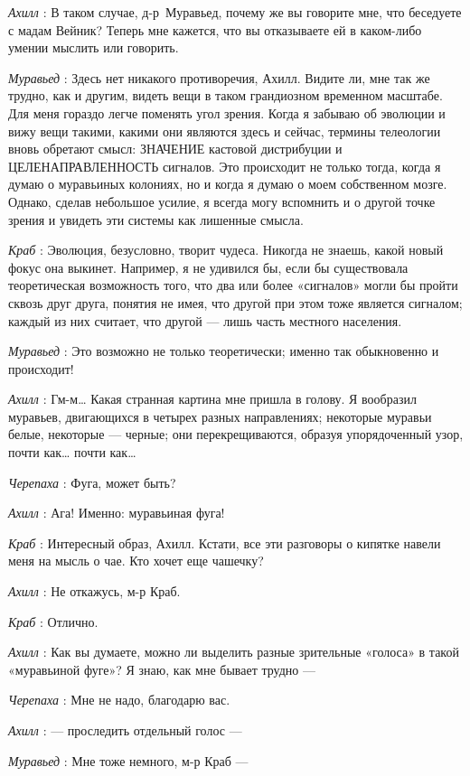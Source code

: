 \documentclass[../main.tex]{subfiles}
\begin{document}
\begin{dialogue}
\emph{Ахилл} : В таком случае, д-р~Муравьед, почему же вы говорите мне, что беседуете с мадам Вейник? Теперь мне кажется, что вы отказываете ей в каком-либо умении мыслить или говорить.

\emph{Муравьед} : Здесь нет никакого противоречия, Ахилл. Видите ли, мне так же трудно, как и другим, видеть вещи в таком грандиозном временном масштабе. Для меня гораздо легче поменять угол зрения. Когда я забываю об эволюции и вижу вещи такими, какими они являются здесь и сейчас, термины телеологии вновь обретают смысл: ЗНАЧЕНИЕ кастовой дистрибуции и ЦЕЛЕНАПРАВЛЕННОСТЬ сигналов. Это происходит не только тогда, когда я думаю о муравьиных колониях, но и когда я думаю о моем собственном мозге. Однако, сделав небольшое усилие, я всегда могу вспомнить и о другой точке зрения и увидеть эти системы как лишенные смысла.

\emph{Краб} : Эволюция, безусловно, творит чудеса. Никогда не знаешь, какой новый фокус она выкинет. Например, я не удивился бы, если бы существовала теоретическая возможность того, что два или более «сигналов» могли бы пройти сквозь друг друга, понятия не имея, что другой при этом тоже является сигналом; каждый из них считает, что другой --- лишь часть местного населения.

\emph{Муравьед} : Это возможно не только теоретически; именно так обыкновенно и происходит!

\emph{Ахилл} : Гм-м\ldots{} Какая странная картина мне пришла в голову. Я вообразил муравьев, двигающихся в четырех разных направлениях; некоторые муравьи белые, некоторые --- черные; они перекрещиваются, образуя упорядоченный узор, почти как\ldots{} почти как\ldots{}

\emph{Черепаха} : Фуга, может быть?

\emph{Ахилл} : Ага! Именно: муравьиная фуга!

\emph{Краб} : Интересный образ, Ахилл. Кстати, все эти разговоры о кипятке навели меня на мысль о чае. Кто хочет еще чашечку?

\emph{Ахилл} : Не откажусь, м-р Краб.

\emph{Краб} : Отлично.

\emph{Ахилл} : Как вы думаете, можно ли выделить разные зрительные «голоса» в такой «муравьиной фуге»? Я знаю, как мне бывает трудно ---

\emph{Черепаха} : Мне не надо, благодарю вас.

\emph{Ахилл} : --- проследить отдельный голос ---

\emph{Муравьед} : Мне тоже немного, м-р Краб ---


\end{dialogue}
\end{document}
